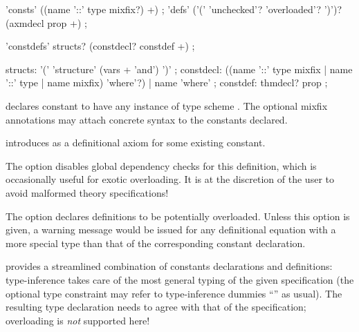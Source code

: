 \begin{isabellebody}
\begin{isamarkuptext}
  \begin{rail}
    'consts' ((name '::' type mixfix?) +)
    ;
    'defs' ('(' 'unchecked'? 'overloaded'? ')')? \\ (axmdecl prop +)
    ;
  \end{rail}

  \begin{rail}
    'constdefs' structs? (constdecl? constdef +)
    ;

    structs: '(' 'structure' (vars + 'and') ')'
    ;
    constdecl:  ((name '::' type mixfix | name '::' type | name mixfix) 'where'?) | name 'where'
    ;
    constdef: thmdecl? prop
    ;
  \end{rail}

  \begin{descr}

  \item [\mbox{\isa{\isacommand{consts}}}~\isa{{\isachardoublequote}c\ {\isacharcolon}{\isacharcolon}\ {\isasymsigma}{\isachardoublequote}}] declares constant
   to have any instance of type scheme \isa{{\isasymsigma}}.  The
  optional mixfix annotations may attach concrete syntax to the
  constants declared.
  
  \item [\mbox{\isa{\isacommand{defs}}}~\isa{{\isachardoublequote}name{\isacharcolon}\ eqn{\isachardoublequote}}] introduces 
  as a definitional axiom for some existing constant.
  
  The  option disables global dependency checks
  for this definition, which is occasionally useful for exotic
  overloading.  It is at the discretion of the user to avoid malformed
  theory specifications!
  
  The  option declares definitions to be
  potentially overloaded.  Unless this option is given, a warning
  message would be issued for any definitional equation with a more
  special type than that of the corresponding constant declaration.
  
  \item [\mbox{\isa{\isacommand{constdefs}}}] provides a streamlined combination of
  constants declarations and definitions: type-inference takes care of
  the most general typing of the given specification (the optional
  type constraint may refer to type-inference dummies ``\isa{{\isacharunderscore}}'' as usual).  The resulting type declaration needs to agree with
  that of the specification; overloading is \emph{not} supported here!
  

\end{descr}
\end{isamarkuptext}
\end{isabellebody}
